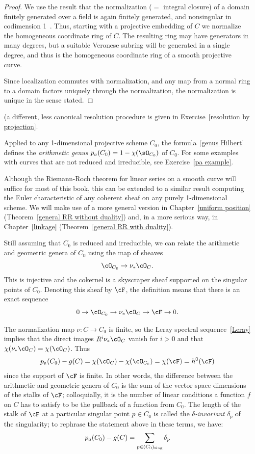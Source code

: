 \begin{proof}
  We use the result that the normalization ($=$ integral closure) of a domain
finitely generated over a field is again finitely generated, and nonsingular in codimension 1~\cite[]{Eisenbud1995}. Thus,
starting with a projective embedding of $C$ we normalize the homogeneous coordinate ring of $C$. The resulting ring
may have generators in many degrees, but a suitable Veronese subring will be generated in a single degree, and thus
is the homogeneous coordinate ring of a smooth projective curve. 

Since localization
commutes with normalization, and any map from a normal ring to a domain factors uniquely through the normalization,
the normalization is unique in the sense stated.
\end{proof}

 (a different, less canonical resolution procedure
is given in Exercise~\ref{resolution by projection}.

Applied to any 1-dimensional projective scheme $C_0$, the formula~\ref{genus Hilbert} defines
the \emph{arithmetic genus} $p_a(C_0) = 1-\chi(\sO_{C_0})$ of $C_0$. For some examples with curves that are not
reduced and irreducible, see Exercise~\ref{pa example}.
 
 Although the Riemann-Roch theorem for linear series on a smooth curve will suffice for most of this book, this can
 be extended to a similar result computing the Euler characteristic of any coherent sheaf on any purely 1-dimensional
 scheme. We will make
 use of a more general version in Chapter~\ref{uniform position} (Theorem~\ref{general RR without duality})
  and, in a more serious way, in Chapter~\ref{linkage} (Theorem~\ref{general RR with duality}). 
 
Still assuming that $C_0$ is reduced and irreducible, we can relate the arithmetic and geometric genera of $C_0$ using the map of sheaves
$$
\cO_{C_0} \to \nu_*\cO_C.
$$
This is injective and the cokernel is a skyscraper sheaf supported on the singular points of $C_0$. Denoting this sheaf by $\cF$, 
the definition means that there is an exact sequence
$$
0 \to \cO_{C_0} \to \nu_*\cO_C \to \cF \to 0.
$$

The normalization map $\nu: C \to C_0$ is finite, so the Leray spectral sequence~\ref{Leray} implies that the direct images $R^i\nu_*\cO_C$ vanish for $i > 0$ and that $\chi(\nu_*\cO_C) = \chi(\cO_C)$. Thus
$$
p_a(C_0) - g(C) =  \chi(\cO_{C}) -   \chi(\cO_{C_0}) = \chi(\cF) = h^0(\cF) 
$$ 
since the support of $\cF$ is finite.
In other words, the difference between the arithmetic and geometric genera of $C_0$ is the sum of the vector space dimensions of the stalks of $\cF$; colloquially, it is the number of linear conditions a function $f$ on $C$ has to satisfy to be the pullback of a function from $C_0$. The length of the stalk of $\cF$ at a particular singular point $p \in C_0$ is called the \emph{$\delta$-invariant} $\delta_p$ of the singularity; to rephrase the statement above in these terms, we have:
$$
p_a(C_0) - g(C) = \sum_{p \in (C_0)_{\rm sing}} \delta_p
$$ 

